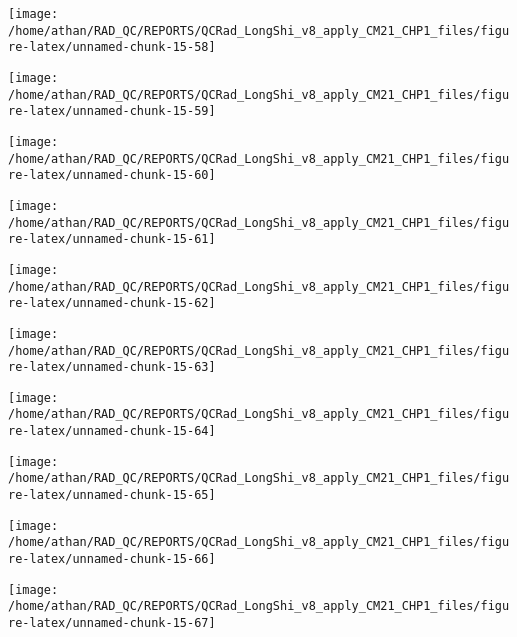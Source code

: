 \documentclass[
  10pt,
  a4paper,oneside]{article}
\begin{document}
\begin{center}\texttt{[image: /home/athan/RAD\_QC/REPORTS/QCRad\_LongShi\_v8\_apply\_CM21\_CHP1\_files/figure-latex/unnamed-chunk-15-58]} \end{center}

\begin{center}\texttt{[image: /home/athan/RAD\_QC/REPORTS/QCRad\_LongShi\_v8\_apply\_CM21\_CHP1\_files/figure-latex/unnamed-chunk-15-59]} \end{center}

\begin{center}\texttt{[image: /home/athan/RAD\_QC/REPORTS/QCRad\_LongShi\_v8\_apply\_CM21\_CHP1\_files/figure-latex/unnamed-chunk-15-60]} \end{center}

\begin{center}\texttt{[image: /home/athan/RAD\_QC/REPORTS/QCRad\_LongShi\_v8\_apply\_CM21\_CHP1\_files/figure-latex/unnamed-chunk-15-61]} \end{center}

\begin{center}\texttt{[image: /home/athan/RAD\_QC/REPORTS/QCRad\_LongShi\_v8\_apply\_CM21\_CHP1\_files/figure-latex/unnamed-chunk-15-62]} \end{center}

\begin{center}\texttt{[image: /home/athan/RAD\_QC/REPORTS/QCRad\_LongShi\_v8\_apply\_CM21\_CHP1\_files/figure-latex/unnamed-chunk-15-63]} \end{center}

\begin{center}\texttt{[image: /home/athan/RAD\_QC/REPORTS/QCRad\_LongShi\_v8\_apply\_CM21\_CHP1\_files/figure-latex/unnamed-chunk-15-64]} \end{center}

\begin{center}\texttt{[image: /home/athan/RAD\_QC/REPORTS/QCRad\_LongShi\_v8\_apply\_CM21\_CHP1\_files/figure-latex/unnamed-chunk-15-65]} \end{center}

\begin{center}\texttt{[image: /home/athan/RAD\_QC/REPORTS/QCRad\_LongShi\_v8\_apply\_CM21\_CHP1\_files/figure-latex/unnamed-chunk-15-66]} \end{center}

\begin{center}\texttt{[image: /home/athan/RAD\_QC/REPORTS/QCRad\_LongShi\_v8\_apply\_CM21\_CHP1\_files/figure-latex/unnamed-chunk-15-67]} \end{center}
\end{document}
